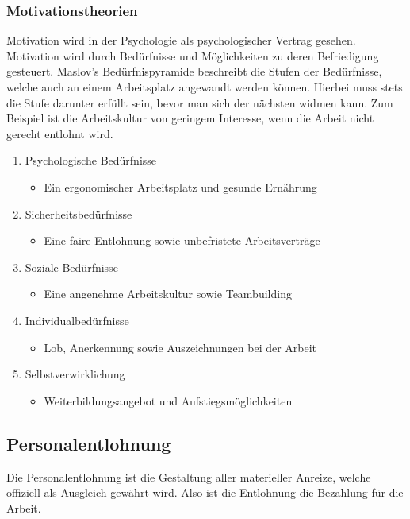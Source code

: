\documentclass{article}
\begin{document}
	 \subsubsection{Motivationstheorien}
	 Motivation wird in der Psychologie als psychologischer Vertrag gesehen. Motivation wird durch Bedürfnisse und Möglichkeiten zu deren Befriedigung gesteuert. Maslov's Bedürfnispyramide beschreibt die Stufen der Bedürfnisse, welche auch an einem Arbeitsplatz angewandt werden können. Hierbei muss stets die Stufe darunter erfüllt sein, bevor man sich der nächsten widmen kann. Zum Beispiel ist die Arbeitskultur von geringem Interesse, wenn die Arbeit nicht gerecht entlohnt wird.
	 \begin{enumerate}
	 	\item{Psychologische Bedürfnisse}
	 	\begin{itemize}
	 		\item{Ein ergonomischer Arbeitsplatz und gesunde Ernährung}
	 	\end{itemize}
	 	\item{Sicherheitsbedürfnisse}
	 	\begin{itemize}
	 		\item{Eine faire Entlohnung sowie unbefristete Arbeitsverträge}
	 	\end{itemize}
	 	\item{Soziale Bedürfnisse}
	 	\begin{itemize}
	 		\item{Eine angenehme Arbeitskultur sowie Teambuilding}
	 	\end{itemize}
	 	\item{Individualbedürfnisse}
	 	\begin{itemize}
	 		\item{Lob, Anerkennung sowie Auszeichnungen bei der Arbeit}
	 	\end{itemize}
	 	\item{Selbstverwirklichung}
	 	\begin{itemize}
	 		\item{Weiterbildungsangebot und Aufstiegsmöglichkeiten}
	 	\end{itemize}
	 \end{enumerate}
	\subsection{Personalentlohnung}
	Die Personalentlohnung ist die Gestaltung aller materieller Anreize, welche offiziell als Ausgleich gewährt wird. Also ist die Entlohnung die Bezahlung für die Arbeit. 
\end{document}
